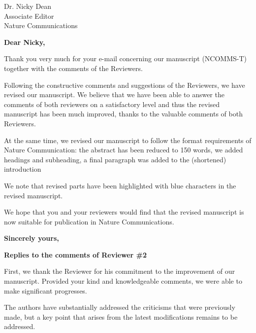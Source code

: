 \documentclass[a4paper, rebuttal, parskip=true, firsthead=false, fromemail=true, foldmarks=false]{scrlttr2}
\begin{document}
 
\begin{letter}{Dr. Nicky Dean\\
Associate Editor\\
Nature Communications}
\opening{\bf Dear Nicky,}

Thank you very much for your e-mail concerning our manuscript (NCOMMS\nobreakdash-T) together with the comments of the Reviewers. 

Following the constructive comments and suggestions of the Reviewers, we have revised our manuscript. 
We believe that we have been able to answer the comments of both reviewers on a satisfactory level and thus the revised manuscript has been much improved, thanks to the valuable comments of both Reviewers. 

At the same time, we revised our manuscript to follow the format requirements of Nature Communication: the abstract has been reduced to 150 words, we added headings and subheading, a final paragraph was added to the (shortened) introduction

We note that revised parts have been highlighted with blue characters in the revised manuscript. 

We hope that you and your reviewers would find that the revised manuscript is now suitable for publication in Nature Communications. 

\closing{\bf Sincerely yours,} 
\clearpage

\textsf{\textbf{Replies to the comments of Reviewer \#2}}

First, we thank the Reviewer for his commitment to the improvement of our manuscript. Provided your kind and knowledgeable comments, we were able to make significant progresses.

\begin{quotationi}
The authors have substantially addressed the criticisms that were previously made, but a key point that arises from the latest modifications remains to be addressed.


\end{quotationi}
\end{letter}
\end{document}
